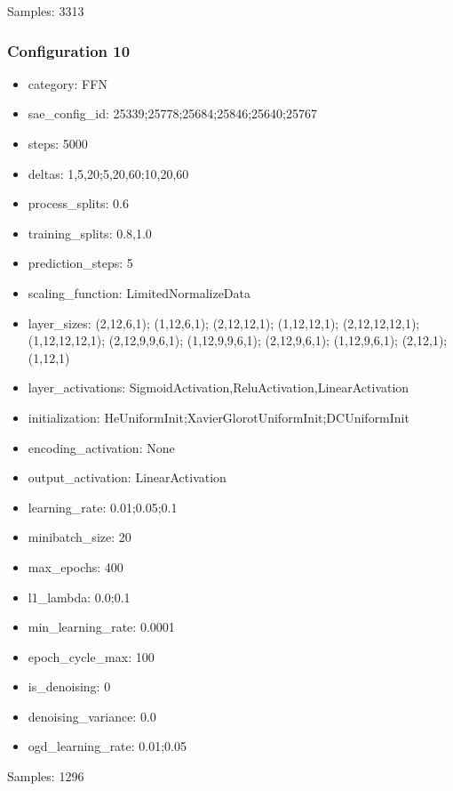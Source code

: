 \documentclass[a4paper,11pt,oneside]{article}
\theoremstyle{plain}
\theoremstyle{definition}
\begin{document}
	Samples: 3313
	
	\subsubsection{Configuration 10}\label{config10}
	\begin{itemize}
		\item category: FFN
		\item sae\_config\_id: 25339;25778;25684;25846;25640;25767
		\item steps: 5000
		\item deltas: 1,5,20;5,20,60;10,20,60
		\item process\_splits: 0.6
		\item training\_splits: 0.8,1.0
		\item prediction\_steps: 5
		\item scaling\_function: LimitedNormalizeData
		\item layer\_sizes: (2,12,6,1); (1,12,6,1); (2,12,12,1); (1,12,12,1); (2,12,12,12,1); (1,12,12,12,1); (2,12,9,9,6,1); (1,12,9,9,6,1); (2,12,9,6,1); (1,12,9,6,1); (2,12,1); (1,12,1)
		\item layer\_activations: SigmoidActivation,ReluActivation,LinearActivation
		\item initialization: HeUniformInit;XavierGlorotUniformInit;DCUniformInit
		\item encoding\_activation: None
		\item output\_activation: LinearActivation
		\item learning\_rate: 0.01;0.05;0.1
		\item minibatch\_size: 20
		\item max\_epochs: 400
		\item l1\_lambda: 0.0;0.1
		\item min\_learning\_rate: 0.0001
		\item epoch\_cycle\_max: 100
		\item is\_denoising: 0
		\item denoising\_variance: 0.0
		\item ogd\_learning\_rate: 0.01;0.05
	\end{itemize}
	
	Samples: 1296
	
\end{document}
